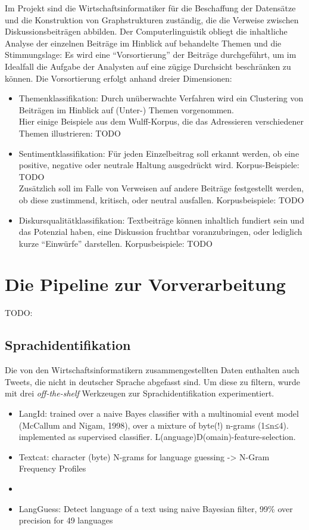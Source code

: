 \documentclass[11pt]{article}
\begin{document}
Im Projekt sind die Wirtschaftsinformatiker für die Beschaffung der
Datensätze und die Konstruktion von Graphstrukturen zuständig, die die
Verweise zwischen Diskussionsbeiträgen abbilden. Der
Computerlinguistik obliegt die inhaltliche Analyse der einzelnen
Beiträge im Hinblick auf behandelte Themen und die Stimmungslage: Es
wird eine ``Vorsortierung'' der Beiträge durchgeführt, um im Idealfall
die Aufgabe der Analysten auf eine zügige Durchsicht beschränken zu
können. Die Vorsortierung erfolgt anhand dreier Dimensionen:
\begin{itemize}
\item Themenklassifikation: Durch unüberwachte Verfahren wird ein
  Clustering von Beiträgen im Hinblick auf (Unter-) Themen
  vorgenommen.\\ Hier einige Beispiele aus dem Wulff-Korpus, die das
  Adressieren verschiedener Themen illustrieren: TODO
\item Sentimentklassifikation: Für jeden Einzelbeitrag soll erkannt
  werden, ob eine positive, negative oder neutrale Haltung ausgedrückt
  wird. Korpus-Beispiele: TODO\\ Zusätzlich soll im Falle von Verweisen auf andere Beiträge
  festgestellt werden, ob diese zustimmend, kritisch, oder neutral
  ausfallen. Korpusbeispiele: TODO
\item Diskursqualitätklassifikation: Textbeiträge können inhaltlich
  fundiert sein und das Potenzial haben, eine Diskussion fruchtbar
  voranzubringen, oder lediglich kurze ``Einwürfe''
  darstellen. Korpusbeispiele: TODO
\end{itemize}


\section{Die Pipeline zur Vorverarbeitung}

TODO:
\subsection{Sprachidentifikation}

Die von den Wirtschaftsinformatikern zusammengestellten Daten
enthalten auch Tweets, die nicht in deutscher Sprache abgefasst
sind. Um diese zu filtern, wurde mit drei {\em off-the-shelf} Werkzeugen zur Sprachidentifikation
experimentiert.

\begin{itemize}
\item LangId: trained over a naive Bayes classifier with a multinomial event
model (McCallum and Nigam, 1998), over a mixture of byte(!) n-grams (1≤n≤4).
implemented as supervised classifier. L(anguage)D(omain)-feature-selection.

\item Textcat: character (byte) N-grams for language guessing -> N-Gram
Frequency Profiles
\item 
\item LangGuess: Detect language of a text using naive Bayesian filter, 99\% over
precision for 49 languages
\end{itemize}
\end{document}
